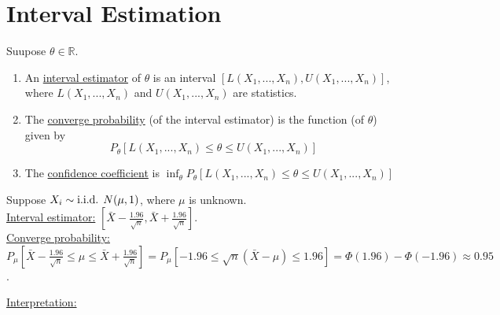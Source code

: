 \documentclass[11pt]{elegantbook}
\begin{document}
\section{Interval Estimation}
\begin{definition}
    \normalfont
    Suupose $\theta\in \mathbb{R}$.
    \begin{enumerate}
        \item An \underline{interval estimator} of $\theta$ is an interval $\left[L(X_1,...,X_n),U(X_1,...,X_n)\right]$, where $L(X_1,...,X_n)$ and $U(X_1,...,X_n)$ are statistics.
        \item The \underline{converge probability} (of the interval estimator) is the function (of $\theta$) given by $$P_\theta\left[L(X_1,...,X_n)\leq\theta\leq U(X_1,...,X_n)\right]$$
        \item The \underline{confidence coefficient} is $\inf_{\theta}P_\theta\left[L(X_1,...,X_n)\leq\theta\leq U(X_1,...,X_n)\right]$
    \end{enumerate}
\end{definition}
\begin{example}
    Suppose $X_i\sim \textnormal{i.i.d. }N(\mu,1)$, where $\mu$ is unknown.\\
    \underline{Interval estimator:} $\left[\bar{X}-\frac{1.96}{\sqrt{n}},\bar{X}+\frac{1.96}{\sqrt{n}}\right]$.\\
    \underline{Converge probability:} $P_\mu\left[\bar{X}-\frac{1.96}{\sqrt{n}}\leq\mu\leq\bar{X}+\frac{1.96}{\sqrt{n}}\right]=P_\mu\left[-1.96\leq\sqrt{n}(\bar{X}-\mu)\leq 1.96\right]=\Phi(1.96)-\Phi(-1.96)\approx 0.95$.
\end{example}
\underline{Interpretation:}
\end{document}
